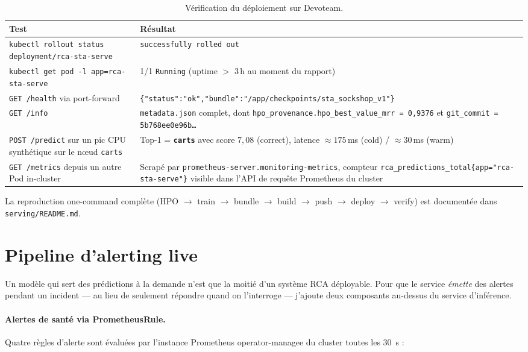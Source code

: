\documentclass[a4paper,11pt,oneside]{report}
\begin{document}
\begin{table}[ht]
\centering
\caption{V\'erification du d\'eploiement sur Devoteam.}
\label{tab:verif-deploy}
\begin{tabular}{p{}p{}}
\toprule
Test & R\'esultat \\
\midrule
\texttt{kubectl rollout status deployment/rca-sta-serve} & \texttt{successfully rolled out} \\
\texttt{kubectl get pod -l app=rca-sta-serve} & 1/1 \texttt{Running} (uptime $>$ 3\,h au moment du rapport) \\
\texttt{GET /health} via port-forward & \texttt{\{"status":"ok","bundle":"/app/checkpoints/sta\_sockshop\_v1"\}} \\
\texttt{GET /info} & \texttt{metadata.json} complet, dont \texttt{hpo\_provenance.hpo\_best\_value\_mrr = 0{,}9376} et \texttt{git\_commit = 5b768ee0e96b\ldots} \\
\texttt{POST /predict} sur un pic CPU synth\'etique sur le nœud \texttt{carts} & Top-1 = \textbf{\texttt{carts}} avec score $7{,}08$ (correct), latence $\approx 175$\,ms (cold) / $\approx 30$\,ms (warm) \\
\texttt{GET /metrics} depuis un autre Pod in-cluster & Scrap\'e par \texttt{prometheus-server.monitoring-metrics}, compteur \texttt{rca\_predictions\_total\{app="rca-sta-serve"\}} visible dans l'API de requ\^ete Prometheus du cluster \\
\bottomrule
\end{tabular}
\end{table}

La reproduction one-command compl\`ete (HPO $\to$ train $\to$ bundle $\to$ build $\to$ push $\to$ deploy $\to$ verify) est document\'ee dans \texttt{serving/README.md}.

\section{Pipeline d'alerting live}
\label{sec:alerting}

Un mod\`ele qui sert des pr\'edictions \`a la demande n'est que la moiti\'e d'un syst\`eme RCA d\'eployable. Pour que le service \emph{\'emette} des alertes pendant un incident --- au lieu de seulement r\'epondre quand on l'interroge --- j'ajoute deux composants au-dessus du service d'inf\'erence.

\paragraph{Alertes de sant\'e via PrometheusRule.}
Quatre r\`egles d'alerte sont \'evalu\'ees par l'instance Prometheus operator-managee du cluster toutes les 30~s :
\end{document}
